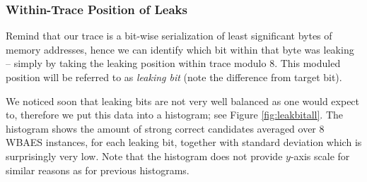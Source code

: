 	
	
	

\subsubsection{Within-Trace Position of Leaks}
	
	Remind that our trace is a bit-wise serialization of least significant bytes of memory addresses, hence we can identify which bit within that byte was leaking -- simply by taking the leaking position within trace modulo $8$. This moduled position will be referred to as {\em leaking bit} (note the difference from target bit).
	
	We noticed soon that leaking bits are not very well balanced as one would expect to, therefore we put this data into a histogram; see Figure \ref{fig:leakbitall}. The histogram shows the amount of strong correct candidates averaged over $8$ WBAES instances, for each leaking bit, together with standard deviation which is surprisingly very low. Note that the histogram does not provide $y$-axis scale for similar reasons as for previous histograms.
	
